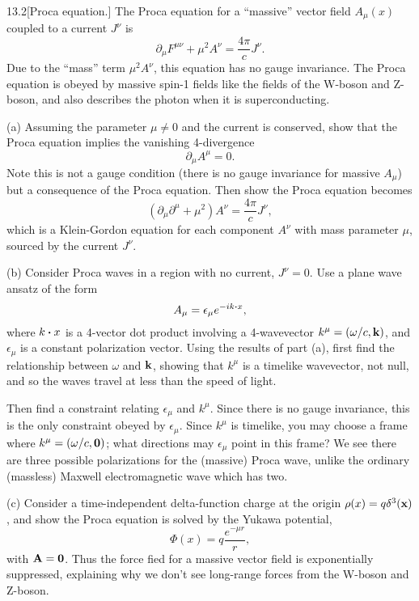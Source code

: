 \documentclass[12pt]{article}
\begin{document}
\begin{problem}{13.2}[Proca equation.]
The Proca equation for a ``massive'' vector field $A_\mu(x)$ coupled to a
current $J^\nu$ is
\begin{equation}
    \partial_\mu F^{\mu\nu}+\mu^2A^\nu=\frac{4\pi}{c}J^\nu. 
\end{equation}
Due to the ``mass'' term $\mu^2A^\nu$, this equation has no gauge invariance.
The Proca equation is obeyed by massive spin-1 fields like the fields of the
W-boson and Z-boson, and also describes the photon when it is superconducting.

(a) Assuming the parameter $\mu\neq0$ and the current is conserved, show that
the Proca equation implies the vanishing 4-divergence
\begin{equation}
    \partial_\mu A^\mu=0. 
\end{equation}
Note this is not a gauge condition (there is no gauge invariance for massive
$A_\mu$) but a consequence of the Proca equation. Then show the Proca equation
becomes
\begin{equation}
    (\partial_\mu\partial^\mu+\mu^2)A^\nu=\frac{4\pi}{c}J^\nu, 
\end{equation}
which is a Klein-Gordon equation for each component $A^\nu$ with mass parameter
$\mu$, sourced by the current $J^\nu$.

(b) Consider Proca waves in a region with no current, $J^\nu=0$. Use a plane
wave ansatz of the form
\begin{equation}
    A_\mu=\epsilon_\mu e^{-ik\vdot x}, 
\end{equation}
where $k\vdot x$ is a 4-vector dot product involving a 4-wavevector
$k^\mu=(\omega/c,\vb{k})$, and $\epsilon_\mu$ is a constant polarization vector.
Using the results of part (a), first find the relationship between $\omega$ and
$\vb{k}$, showing that $k^\mu$ is a timelike wavevector, not null, and so the
waves travel at less than the speed of light.

Then find a constraint relating $\epsilon_\mu$ and $k^\mu$. Since there is no
gauge invariance, this is the only constraint obeyed by $\epsilon_\mu$. Since
$k^\mu$ is timelike, you may choose a frame where $k^\mu=(\omega/c,\vb{0})$;
what directions may $\epsilon_\mu$ point in this frame? We see there are three
possible polarizations for the (massive) Proca wave, unlike the ordinary
(massless) Maxwell electromagnetic wave which has two.

(c) Consider a time-independent delta-function charge at the origin
$\rho(x)=q\delta^3(\vb{x})$, and show the Proca equation is solved by the Yukawa
potential,
\begin{equation}
    \Phi(x)=q\frac{e^{-\mu r}}{r}, 
\end{equation}
with $\vb{A}=\vb{0}$. Thus the force fied for a massive vector field is
exponentially suppressed, explaining why we don't see long-range forces from the
W-boson and Z-boson.


\end{problem}
\end{document}
